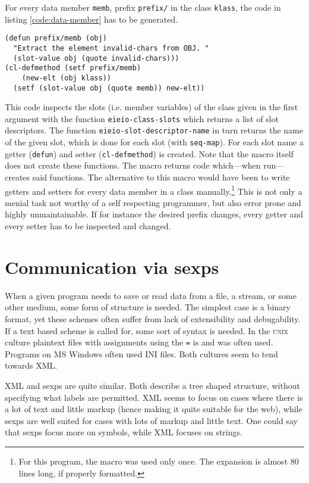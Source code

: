 \documentclass[a4paper,10pt,twoside]{report}
\newcommand{\sym}[1]{\texttt{#1}}
\newcommand{\fun}[1]{\texttt{#1}}
\newcommand{\unix}{\textsc{unix}}
\newcommand{\windows}{MS Windows\texttrademark}
\begin{document}
For every data member \sym{memb}, prefix \sym{prefix/} in the class
\sym{klass}, the code in listing \ref{code:data-member} has to be generated.

\begin{lstlisting}[style=lispcode,caption={Getter and Setter for a member called
  \sym{member}.},label={code:data-member}]
(defun prefix/memb (obj)
  "Extract the element invalid-chars from OBJ. "
  (slot-value obj (quote invalid-chars)))
(cl-defmethod (setf prefix/memb)
    (new-elt (obj klass))
  (setf (slot-value obj (quote memb)) new-elt))
\end{lstlisting}

This code inspects the slots (i.e. member variables) of the class given in the
first argument with the function \fun{eieio-class-slots} which returns a list of
slot descriptors.  The function \fun{eieio-slot-descriptor-name} in turn returns
the name of the given slot, which is done for each slot (with \fun{seq-map}).
For each slot name a getter (\fun{defun}) and setter (\fun{cl-defmethod}) is
created.  Note that the macro itself does not create these functions.  The macro
returns code which---when run---creates said functions.  The alternative to this
macro would have been to write getters and setters for every data member in a
class manually.\footnote{For this program, the macro was used only once.  The
  expansion is almost 80 lines long, if properly formatted.}  This is not only a
menial task not worthy of a self respecting programmer, but also error prone and
highly unmaintainable.  If for instance the desired prefix changes, every getter
and every setter has to be inspected and changed.

\section{Communication via sexps}
\label{subsec:sexp-communication}

When a given program needs to save or read data from a file, a stream, or some
other medium, some form of structure is needed.  The simplest case is a binary
format, yet these schemes often suffer from lack of extensibility and
debugability.  If a text based scheme is called for, some sort of syntax is
needed.  In the \unix{} culture plaintext files with assignments using the
\texttt{=} is and was often used.  Programs on \windows{} often used INI files.
Both cultures seem to tend towards XML.  

XML and sexps are quite similar.  Both describe a tree shaped structure, without
specifying what labels are permitted.  XML seems to focus on cases where there
is a lot of text and little markup (hence making it quite suitable for the web),
while sexps are well suited for cases with lots of markup and little text.  One
could say that sexps focus more on symbols, while XML focuses on strings.
\end{document}
